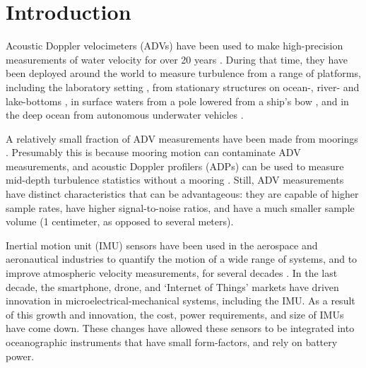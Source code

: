 
\section{Introduction}

Acoustic Doppler velocimeters (ADVs) have been used to make high-precision measurements of water velocity for over 20 years \cite[]{Kraus++1994, Lohrmann++1995}.  During that time, they have been deployed around the world to measure turbulence from a range of platforms, including the laboratory setting \cite[]{Voulgaris+Trowbridge1998}, from stationary structures on ocean-, river- and lake-bottoms \cite[]{Kim++2000, Lorke2007, Cartwright++2009}, in surface waters from a pole lowered from a ship's bow \cite[]{Geyer++2008}, and in the deep ocean from autonomous underwater vehicles \cite[e.g.,][]{Zhang++2001, Goodman++2006}. 


A relatively small fraction of ADV measurements have been made from moorings \cite[e.g.,][]{Fer+Paskyabi2014}. Presumably this is because mooring motion can contaminate ADV measurements, and acoustic Doppler profilers (ADPs) can be used to measure mid-depth turbulence statistics without a mooring \cite[e.g.,][]{Stacey++1999a, Rippeth++2002, Wiles++2006, Guerra+Thomson2017}. Still, ADV measurements have distinct characteristics that can be advantageous: they are capable of higher sample rates, have higher signal-to-noise ratios, and have a much smaller sample volume (1 centimeter, as opposed to several meters). 

Inertial motion unit (IMU) sensors have been used in the aerospace and aeronautical industries to quantify the motion of a wide range of systems, and to improve atmospheric velocity measurements, for several decades \cite[]{Axford1968, Edson++1998, Bevly2004}. In the last decade, the smartphone, drone, and `Internet of Things' markets have driven innovation in microelectrical-mechanical systems, including the IMU. As a result of this growth and innovation, the cost, power requirements, and size of IMUs have come down. These changes have allowed these sensors to be integrated into oceanographic instruments that have small form-factors, and rely on battery power.

